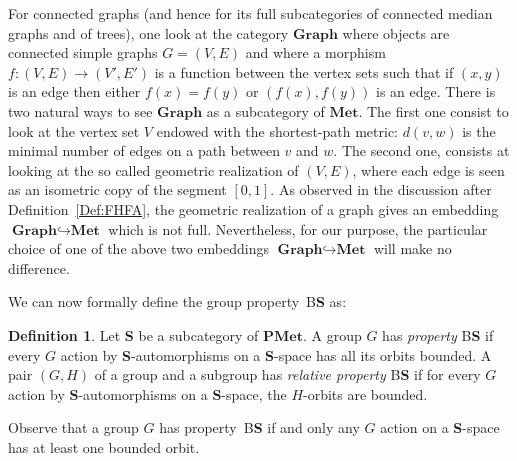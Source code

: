 \documentclass[a4paper]{article}
\theoremstyle{definition}
\newtheorem{defn}[lem]{Definition}
\DeclareMathOperator\Aut{Aut}
\newcommand*{\field}[1]{\mathbf{#1}}
\newcommand*{\category}[1]{\textbf{#1}}
\newcommand*{\PMet}{\category{PMet}}
\newcommand*{\CatS}{\category{S}}
\newcommand*{\Z}{\field{Z}}
\newcommand*{\R}{\field{R}}
\newcommand*{\BS}{B\textbf{S}}
\begin{document}
For connected graphs (and hence for its full subcategories of connected median graphs and of trees), one look at the category $\category{Graph}$ where objects are connected simple graphs $G=(V,E)$ and where a morphism $f\colon (V,E)\to(V',E')$ is a function between the vertex sets such that if $(x,y)$ is an edge then either $f(x)=f(y)$ or $(f(x),f(y))$ is an edge.
There is two natural ways to see $\category{Graph}$ as a subcategory of $\category{Met}$.
The first one consist to look at the vertex set $V$ endowed with the shortest-path metric: $d(v,w)$ is the minimal number of edges on a path between $v$ and $w$.
The second one, consists at looking at the so called geometric realization of $(V,E)$, where each edge is seen as an isometric copy of the segment $[0,1]$.
As observed in the discussion after Definition~\ref{Def:FHFA}, the geometric realization of a graph gives an embedding $\category{Graph}\hookrightarrow\category{Met}$ which is not full.
Nevertheless, for our purpose, the particular choice of one of the above two embeddings $\category{Graph}\hookrightarrow\category{Met}$ will make no difference.


We can now formally define the group property~\BS{} as:
%
\begin{defn}\label{Def:PropBS}
Let $\category S$ be a subcategory of $\PMet$.
A group $G$ has \emph{property} \BS{} if every $G$ action by \CatS-automorphisms on a $\category S$-space has all its orbits bounded.
A pair $(G,H)$ of a group and a subgroup has \emph{relative property} \BS{} if for every $G$ action by $\category S$-automorphisms on a $\category S$-space, the $H$-orbits are bounded.
\end{defn}
%
%
Observe that a group $G$ has property~\BS{} if and only any $G$ action on a \CatS-space has at least one bounded orbit.
\end{document}
